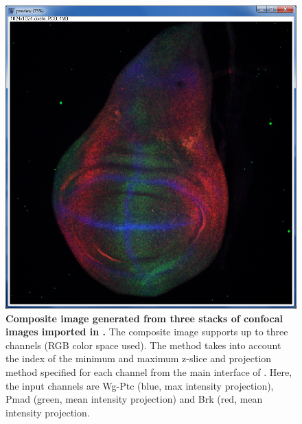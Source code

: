 \begin{figure}[!h]
\centering
\includegraphics[scale=0.4]{images/composite.jpg}
\caption{\textbf{Composite image generated from three stacks of confocal images imported in \wingj.} The composite image supports up to three channels (RGB color space used). The method takes into account the index of the minimum and maximum z-slice and projection method specified for each channel from the main interface of \wingj. Here, the input channels are Wg-Ptc (blue, max intensity projection), Pmad (green, mean intensity projection) and Brk (red, mean intensity projection.}
\label{fig:composite}
\end{figure}

